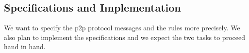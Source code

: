 \documentclass{article}
\begin{document}
\subsection{Specifications and Implementation}

We want to specify the p2p protocol messages and the rules more
precisely. We also plan to implement the specifications and we expect
the two tasks to proceed hand in hand.

 

\end{document}
